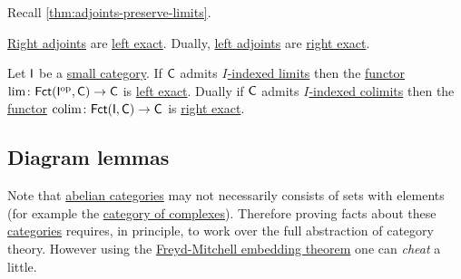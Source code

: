 \documentclass[../../main]{subfiles}
\begin{document}
\begin{example}\label{ex:adjoint-functors-and-exactness}
  Recall \autoref{thm:adjoints-preserve-limits}.
  
  \hyperref[def:adjoint-functors]{Right adjoints} are \hyperref[def:exact-functor]{left exact}.
  Dually, \hyperref[def:adjoint-functors]{left adjoints} are \hyperref[def:exact-functor]{right exact}.
\end{example}

\begin{example}\label{ex:limit-colimit-exact}
  Let \(\mathsf{I}\) be a \hyperref[def:small-category]{small category}.
  If \(\mathsf{C}\) admits \hyperref[def:categorical-limit]{\(I\)-indexed limits} then the \hyperref[def:functor]{functor} \(\lim\colon \mathsf{Fct}(\mathsf{I}^{\operatorname*{op}}, \mathsf{C}) \to \mathsf{C}\) is \hyperref[def:exact-functor]{left exact}.
  Dually if \(\mathsf{C}\) admits \hyperref[def:categorical-colimit]{\(I\)-indexed colimits} then the \hyperref[def:functor]{functor} \(\operatorname*{colim}\colon \mathsf{Fct}(\mathsf{I}, \mathsf{C}) \to \mathsf{C}\) is \hyperref[def:exact-functor]{right exact}.
\end{example}



\subsection{Diagram lemmas}

Note that \hyperref[def:abelian-category]{abelian categories} may not necessarily consists of sets with elements (for example the \hyperref[def:complex]{category of complexes}).
Therefore proving facts about these \hyperref[def:category]{categories} requires, in principle, to work over the full abstraction of category theory.
However using the \hyperref[thm:freyd-mitchell]{Freyd-Mitchell embedding theorem} one can \textit{cheat} a little.
\end{document}
